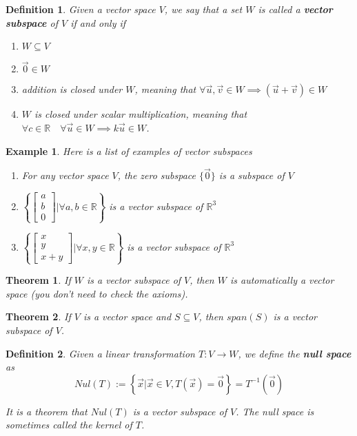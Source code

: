 \documentclass[11pt]{article}
\newtheorem{thm}{Theorem}
\newtheorem{defn}{Definition}
\newtheorem{ex}{Example}
\begin{document}
\begin{defn}
  Given a vector space $V$, we say that a set $W$ is called a \textbf{vector subspace} of $V$ if and only if
  \begin{enumerate}
    \item $W \subseteq V$
    \item $\vec{0} \in W$
    \item addition is closed under $W$, meaning that $\forall \vec{u},\vec{v} \in W \implies (\vec{u} + \vec{v}) \in W$
    \item $W$ is closed under scalar multiplication, meaning that $\forall c \in \mathbb{R} \quad \forall \vec{u} \in W \implies k\vec{u} \in W$.
  \end{enumerate}
\end{defn}


\begin{ex}
  Here is a list of examples of vector subspaces
  \begin{enumerate}
    \item For any vector space $V$, the zero subspace $\{\vec{0}\}$ is a subspace of $V$
    \item $\left \{ \begin{bmatrix} a \\ b \\ 0 \end{bmatrix} | \forall a , b \in \mathbb{R} \right\}$ is a vector subspace of $\mathbb{R}^{3}$
    \item $\left\{ \begin{bmatrix} x \\ y \\ x + y \end{bmatrix} | \forall x , y \in \mathbb{R} \right\}$ is a vector subspace of $\mathbb{R}^{3}$
\end{enumerate}
\end{ex}
\begin{thm}
  If $W$ is a vector subspace of $V$, then $W$ is automatically a vector space (you don't need to check the axioms).
\end{thm}

\begin{thm}
  If $V$ is a vector space and $S \subseteq V$, then $span(S)$ is a vector subspace of $V$.
\end{thm}


\begin{defn}
  Given a linear transformation $T : V \to W$, we define the \textbf{null space} as
  \[Nul(T) := \left\{ \vec{x} | \vec{x} \in V , T(\vec{x}) = \vec{0} \right\} = T^{-1}(\vec{0})\]

  It is a theorem that $Nul(T)$ is a vector subspace of $V$. The null space is sometimes called the kernel of $T$.
\end{defn}
\end{document}
